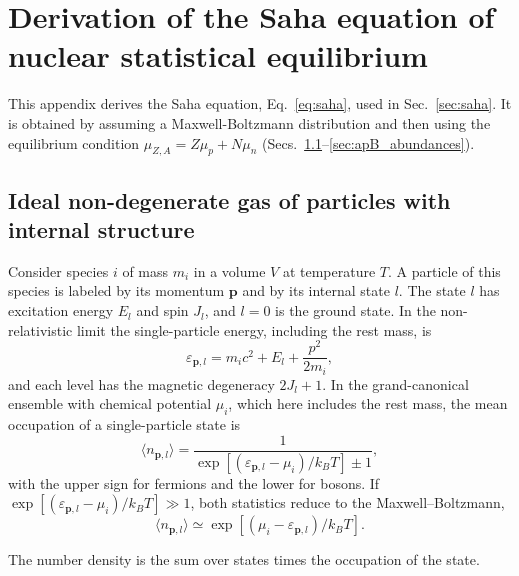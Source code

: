 \chapter{Derivation of the Saha equation of nuclear statistical equilibrium}\label{ap:Detailed_balance}

This appendix derives the Saha equation, Eq.~\ref{eq:saha}, used in Sec.~\ref{sec:saha}.
It is obtained by assuming a Maxwell-Boltzmann distribution and then using the equilibrium condition $\mu_{Z,A}=Z\mu_{p}+N\mu_{n}$ (Secs.~\ref{sec:apB_ideal}--\ref{sec:apB_abundances}).
\section{Ideal non-degenerate gas of particles with internal structure}\label{sec:apB_ideal}

Consider species $i$ of mass $m_i$ in a volume $V$ at temperature $T$.
A particle of this species is labeled by its momentum $\mathbf p$ and by its internal state $l$.
The state $l$ has excitation energy $E_l$ and spin $J_l$, and $l=0$ is the ground state.
In the non-relativistic limit the single-particle energy, including the rest mass, is
\begin{equation}\label{eq:apB_energy}
  \varepsilon_{\mathbf p,l}=m_ic^2+E_l+\frac{p^2}{2m_i},
\end{equation}
and each level has the magnetic degeneracy $2J_l+1$.
In the grand-canonical ensemble with chemical potential $\mu_i$, which here includes the rest mass, the mean occupation of a single-particle state is
\begin{equation}\label{eq:apB_occupation}
  \langle n_{\mathbf p,l}\rangle=\frac{1}{\exp\left[(\varepsilon_{\mathbf p,l}-\mu_i)/k_BT\right]\pm1},
\end{equation}
with the upper sign for fermions and the lower for bosons.
If $\exp[(\varepsilon_{\mathbf p,l}-\mu_i)/k_BT]\gg1$, both statistics reduce to the Maxwell--Boltzmann, 
\begin{equation}
    \langle n_{\mathbf p,l}\rangle\simeq\exp[(\mu_i-\varepsilon_{\mathbf p,l})/k_BT].
\end{equation}

\noindent The number density is the sum over states times the occupation of the state.

